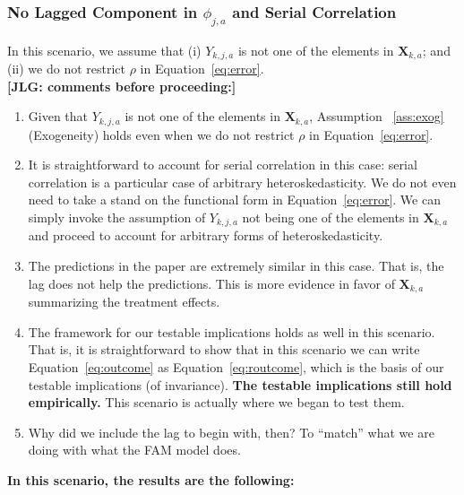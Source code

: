 \subsubsection{No Lagged Component in $\phi_{j,a}$ and Serial Correlation}

\noindent In this scenario, we assume that (i)  $Y_{k,j,a}$ is not one of the elements in $\bm{X}_{k,a}$; and (ii) we do not restrict $\rho$ in Equation~\eqref{eq:error}.\\

\noindent \textbf{[JLG: comments before proceeding:]}

\begin{enumerate}

\item Given that $Y_{k,j,a}$ is not one of the elements in $\bm{X}_{k,a}$, Assumption ~\ref{ass:exog} (Exogeneity) holds even when we do not restrict $\rho$ in Equation~\eqref{eq:error}. 

\item It is straightforward to account for serial correlation in this case: serial correlation is a particular case of arbitrary heteroskedasticity. We do not even need to take a stand on the functional form in Equation~\eqref{eq:error}. We can simply invoke the assumption of $Y_{k,j,a}$ not being one of the elements in $\bm{X}_{k,a}$ and proceed to account for arbitrary forms of heteroskedasticity. 

\item The predictions in the paper are extremely similar in this case. That is, the lag does not help the predictions. This is more evidence in favor of $\bm{X}_{k,a}$ summarizing the treatment effects.

\item The framework for our testable implications holds as well in this scenario. That is, it is straightforward to show that in this scenario we can write Equation~\ref{eq:outcome} as Equation~\ref{eq:routcome}, which is the basis of our testable implications (of invariance). \textbf{The testable implications still hold empirically.} This scenario is actually where we began to test them.

\item Why did we include the lag to begin with, then? To ``match'' what we are doing with what the FAM model does. 

\end{enumerate}

\noindent \textbf{In this scenario, the results are the following:}\\

